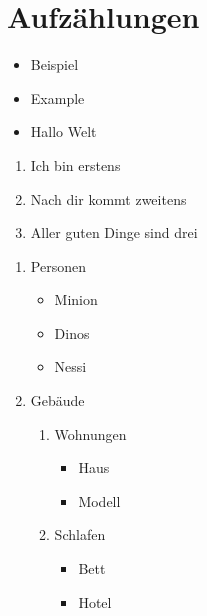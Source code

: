 
\chapter{Aufzählungen}

	\begin{itemize}								%
		\item Beispiel							%
		\item Example
		\item Hallo Welt
	\end{itemize}								%
	
	\begin{enumerate}							%
		\item Ich bin erstens					%
		\item Nach dir kommt zweitens	
		\item Aller guten Dinge sind drei
	\end{enumerate}								%
	
	\begin{enumerate}
		\item Personen
		\begin{itemize}
			\item Minion
			\item Dinos
			\item Nessi
		\end{itemize}
		\item Gebäude
		\begin{enumerate}
			\item Wohnungen
			\begin{itemize}
				\item Haus
				\item Modell
			\end{itemize}
			\item Schlafen
			\begin{itemize}
				\item Bett
				\item Hotel
			\end{itemize}
		\end{enumerate}
	\end{enumerate}